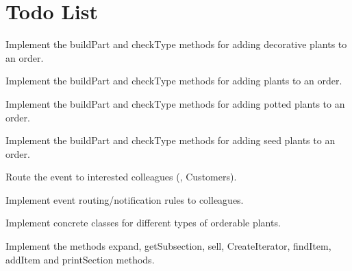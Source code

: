 \chapter{Todo List}
\hypertarget{todo}{}\label{todo}

\begin{DoxyRefList}
\item[File \doxylink{AddDecoration_8cpp}{Add\+Decoration.cpp} ]\label{todo__todo000001}%
%
Implement the build\+Part and check\+Type methods for adding decorative plants to an order.  
\item[File \doxylink{AddPlant_8cpp}{Add\+Plant.cpp} ]\label{todo__todo000002}%
%
Implement the build\+Part and check\+Type methods for adding plants to an order.  
\item[File \doxylink{AddPot_8cpp}{Add\+Pot.cpp} ]\label{todo__todo000003}%
%
Implement the build\+Part and check\+Type methods for adding potted plants to an order.  
\item[File \doxylink{AddSeed_8cpp}{Add\+Seed.cpp} ]\label{todo__todo000004}%
%
Implement the build\+Part and check\+Type methods for adding seed plants to an order.  
\item[Member \doxylink{classNurseryHub_a03feb716f9e3d82d669f32f555e96617}{Nursery\+Hub\+::notify} (void \texorpdfstring{$\ast$}{*}sender, std\+::string event, std\+::string data) override]\label{todo__todo000005}%
%
Route the event to interested colleagues (, Customers). 

\label{todo__todo000006}%
%
Implement event routing/notification rules to colleagues.  
\item[Class \doxylink{classOrderPlant}{Order\+Plant} ]\label{todo__todo000008}%
%
Implement concrete classes for different types of orderable plants.  
\item[File \doxylink{Section_8cpp}{Section.cpp} ]\label{todo__todo000009}%
%
Implement the methods expand, get\+Subsection, sell, Create\+Iterator, find\+Item, add\+Item and print\+Section methods. 
\end{DoxyRefList}